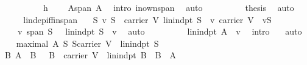 \begin{isabellebody}
\ \ \isamarkupfalse%
\ {\isacharminus}\ \isanewline
\ \ \ \ \isamarkupfalse%
\ h{}\ {}\ \isamarkupfalse%
\ {}{}{\isacharcolon}\ {\isachardoublequoteopen}A{\isasymsubseteq}span\ A{\isachardoublequoteclose}\ \isamarkupfalse%
\ {\isacharparenleft}intro\ in{\isacharunderscore}own{\isacharunderscore}span{\isacharparenright}\ \isamarkupfalse%
\ auto\isanewline
\ \ \ \ \isamarkupfalse%
\ {}\ {}{}\ \isamarkupfalse%
\ {\isacharquery}thesis\ \isamarkupfalse%
\ auto\isanewline
\ \ \isamarkupfalse%
\isanewline
\ \ \isamarkupfalse%
\ lin{\isacharunderscore}dep{\isacharunderscore}iff{\isacharunderscore}in{\isacharunderscore}span\ \isamarkupfalse%
\ {}{\isacharcolon}\ {\isachardoublequoteopen}{\isasymAnd}S\ v{\isachardot}\ S\ {\isasymsubseteq}\ carrier\ V{\isasymand}\ lin{\isacharunderscore}indpt\ S\ {\isasymand}\ v{\isasymin}\ carrier\ V\ {\isasymand}\ v{\isasymnotin}S\isanewline
\ \ \ \ {\isasymand}\ v{\isasymnotin}\ span\ S\ {\isasymLongrightarrow}\ \ {\isacharparenleft}lin{\isacharunderscore}indpt\ {\isacharparenleft}S\ {\isasymunion}\ {\isacharbraceleft}v{\isacharbraceright}{\isacharparenright}{\isacharparenright}{\isachardoublequoteclose}\ \isamarkupfalse%
\ auto\isanewline
\ \ \isamarkupfalse%
\ {}\ {}\ {}\ \isamarkupfalse%
\ {}{\isacharcolon}\ {\isachardoublequoteopen}lin{\isacharunderscore}indpt\ {\isacharparenleft}A\ {\isasymunion}\ {\isacharbraceleft}v{\isacharbraceright}{\isacharparenright}{\isachardoublequoteclose}\ \isamarkupfalse%
\ {\isacharparenleft}intro\ {}{\isacharparenright}\ \isamarkupfalse%
\ auto\isanewline
\isanewline
\ \ \isamarkupfalse%
\ {}{\isacharcolon}\ {\isachardoublequoteopen}{\isasymnot}{\isacharparenleft}maximal\ A\ {\isacharparenleft}{\isasymlambda}S{\isachardot}\ S{\isasymsubseteq}carrier\ V\ {\isasymand}\ lin{\isacharunderscore}indpt\ S{\isacharparenright}{\isacharparenright}{\isachardoublequoteclose}\isanewline
\ \ \isamarkupfalse%
\ {\isacharminus}\ \isanewline
\ \ \ \ \isamarkupfalse%
\ {}\ {}\ {}\ {}\ \isamarkupfalse%
\ {}{\isacharcolon}\ {\isachardoublequoteopen}{\isacharparenleft}{\isasymexists}B{\isachardot}\ A\ {\isasymsubseteq}\ B\ \ {\isasymand}\ B\ {\isasymsubseteq}\ carrier\ V\ {\isasymand}\ lin{\isacharunderscore}indpt\ B\ {\isasymand}\ B\ {\isasymnoteq}\ A{\isacharparenright}{\isachardoublequoteclose}\isanewline

\end{isabellebody}
